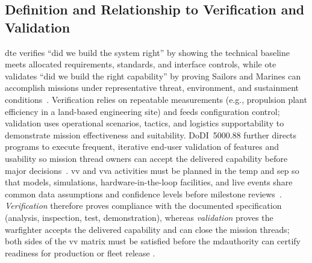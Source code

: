 \documentclass[../main.tex]{subfiles}
\begin{document}
\subsection{Definition and Relationship to Verification and Validation}
  \ac{dte} verifies ``did we build the system right'' by showing the technical baseline meets allocated requirements, standards, and interface controls, while \ac{ote} validates ``did we build the right capability'' by proving Sailors and Marines can accomplish missions under representative threat, environment, and sustainment conditions~\autocite{DoDI5000-02}. Verification relies on repeatable measurements (e.g., propulsion plant efficiency in a land-based engineering site) and feeds configuration control; validation uses operational scenarios, tactics, and logistics supportability to demonstrate mission effectiveness and suitability. DoDI~5000.88 further directs programs to execute frequent, iterative end-user validation of features and usability so mission thread owners can accept the delivered capability before major decisions~\autocite{DoDI5000-88}. \ac{vv} and \ac{vva} activities must be planned in the \ac{temp} and \ac{sep} so that models, simulations, hardware-in-the-loop facilities, and live events share common data assumptions and confidence levels before milestone reviews~\autocite{DoDI5000-89}.
  \textit{Verification} therefore proves compliance with the documented specification (analysis, inspection, test, demonstration), whereas \textit{validation} proves the warfighter accepts the delivered capability and can close the mission threads; both sides of the \ac{vv} matrix must be satisfied before the \ac{mdauthority} can certify readiness for production or fleet release \autocite{DoDI5000-89}.
\end{document}
